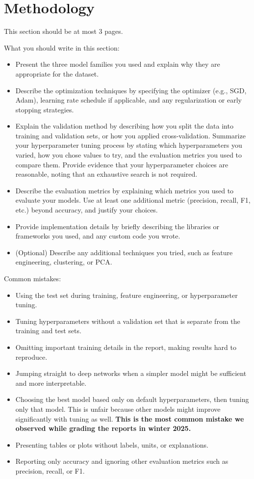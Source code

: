 \documentclass[12pt]{article}
\begin{document}
\section{Methodology}

This section should be at most 3 pages.

What you should write in this section:
\begin{itemize}
  \item Present the three model families you used and explain why they are appropriate for the dataset.  
  \item Describe the optimization techniques by specifying the optimizer (e.g., SGD, Adam), learning rate schedule if applicable, and any regularization or early stopping strategies.  
  \item Explain the validation method by describing how you split the data into training and validation sets, or how you applied cross-validation. Summarize your hyperparameter tuning process by stating which hyperparameters you varied, how you chose values to try, and the evaluation metrics you used to compare them. Provide evidence that your hyperparameter choices are reasonable, noting that an exhaustive search is not required.  
  \item Describe the evaluation metrics by explaining which metrics you used to evaluate your models. Use at least one additional metric (precision, recall, F1, etc.) beyond accuracy, and justify your choices.  
  \item Provide implementation details by briefly describing the libraries or frameworks you used, and any custom code you wrote.  
  \item (Optional) Describe any additional techniques you tried, such as feature engineering, clustering, or PCA.  
\end{itemize}

Common mistakes: 
\begin{itemize}
    \item Using the test set during training, feature engineering, or hyperparameter tuning. 
    \item Tuning hyperparameters without a validation set that is separate from the training and test sets.  
    \item Omitting important training details in the report, making results hard to reproduce.  
    \item Jumping straight to deep networks when a simpler model might be sufficient and more interpretable.  
    \item Choosing the best model based only on default hyperparameters, then tuning only that model. This is unfair because other models might improve significantly with tuning as well. \textbf{This is the most common mistake we observed while grading the reports in winter 2025.}
    \item Presenting tables or plots without labels, units, or explanations.  
    \item Reporting only accuracy and ignoring other evaluation metrics such as precision, recall, or F1.  
\end{itemize}
\end{document}
